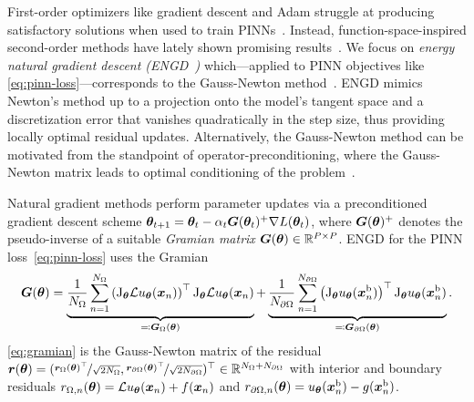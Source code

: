First-order optimizers like gradient descent and Adam struggle at producing satisfactory solutions when used to train PINNs~\citep{cuomo2022scientific}.
Instead, function-space-inspired second-order methods have lately shown promising results~\citep{muller2024optimization}.
We focus on \emph{energy natural gradient descent (ENGD~\cite{muller2023achieving})} which---applied to PINN objectives like \eqref{eq:pinn-loss}---corresponds to the Gauss-Newton method~\cite[Chapter 6.3][]{bottou2016machine}.
ENGD mimics Newton's method up to a projection onto the model's tangent space and a discretization error that vanishes quadratically in the step size, thus providing locally optimal residual updates.
Alternatively, the Gauss-Newton method can be motivated from the standpoint of operator-preconditioning, where the Gauss-Newton matrix leads to optimal conditioning of the problem~\citep{de2023operator}.

Natural gradient methods perform parameter updates via a preconditioned gradient descent scheme ${\bm{\theta}}_{t+1} = {\bm{\theta}}_t - \alpha_t {\bm{G}}({\bm{\theta}}_t)^+\nabla L({\bm{\theta}}_t)$, where ${\bm{G}}({\bm{\theta}})^+$ denotes the pseudo-inverse of a suitable \emph{Gramian matrix} ${\bm{G}}({\bm{\theta}}) \in {\mathbb{R}}^{P \times P}$.
ENGD for the PINN loss~\eqref{eq:pinn-loss} uses the Gramian
\begin{equation}\label{eq:gramian}
  {\bm{G}}({\bm{\theta}})
  =
  \underbrace{\frac1{{N_\Omega}}
    \sum_{n=1}^{N_\Omega}
    \left( \mathrm{J}_{{\bm{\theta}}} \mathcal{L} u_{\bm{\theta}}({\bm{x}}_n) \right)^\top
    \mathrm{J}_{{\bm{\theta}}} \mathcal{L} u_{\bm{\theta}}({\bm{x}}_n)
  }_{\eqqcolon {\bm{G}}_\Omega({\bm{\theta}})}
  +
  \underbrace{
    \frac1{{N_{\partial\Omega}}} \sum_{n=1}^{N_{\partial\Omega}}
    \left(\mathrm{J}_{{\bm{\theta}}} u_{\bm{\theta}}({\bm{x}}_n^\text{b})  \right)^\top
    \mathrm{J}_{{\bm{\theta}}} u_{\bm{\theta}} ({\bm{x}}_n^\text{b})
  }_{\eqqcolon {\bm{G}}_{\partial\Omega}({\bm{\theta}})}.
\end{equation}
\eqref{eq:gramian} is the Gauss-Newton matrix of the residual ${\bm{r}}({\bm{\theta}}) = (\nicefrac{{\bm{r}}_\Omega({\bm{\theta}})^{\top}}{\sqrt{2N_\Omega}}, \nicefrac{{\bm{r}}_{\partial\Omega}({\bm{\theta}})^{\top}}{\sqrt{2N_{\partial\Omega}}} )^\top \in {\mathbb{R}}^{N_{\Omega} + N_{\partial\Omega}}$ with interior and boundary residuals $r_{\Omega,n}({\bm{\theta}}) = \mathcal{L} u_{\bm{\theta}}({\bm{x}}_n) + f({\bm{x}}_n)$ and $r_{\partial\Omega,n}({\bm{\theta}}) = u_{\bm{\theta}}({\bm{x}}_n^\text{b}) - g({\bm{x}}_n^\text{b})$.

